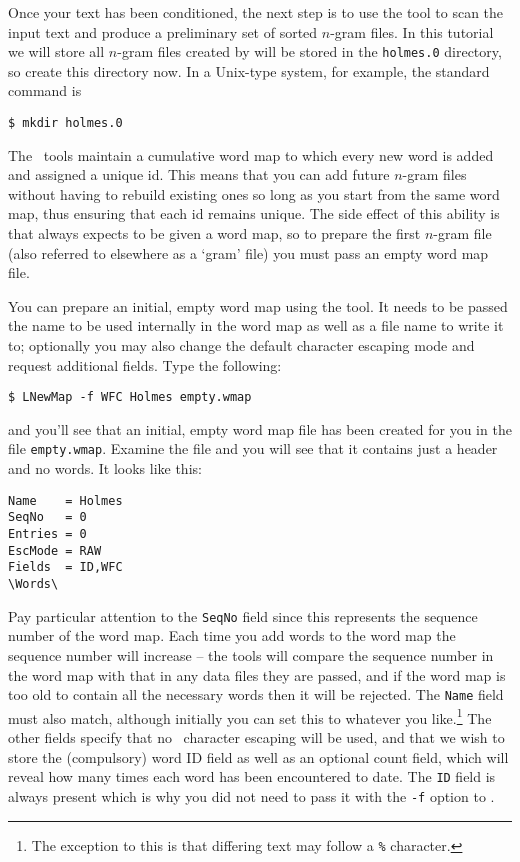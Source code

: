 Once your text has been conditioned, the next step is to use the tool
 to scan the input text and produce a
preliminary set of sorted $n$-gram files.  In this tutorial we will
store all $n$-gram files created by  will be stored in
the \texttt{holmes.0} directory, so create this directory now.  In a
Unix-type system, for example, the standard command is
\begin{verbatim}
$ mkdir holmes.0
\end{verbatim} %

The \HTK\ tools maintain a cumulative word map to which every new
word is added and assigned a unique id.  This means that you can add
future $n$-gram files without having to rebuild existing ones so long
as you start from the same word map, thus ensuring that each id
remains unique.  The side effect of this ability is that
 always expects to be given a word map, so to prepare
the first $n$-gram file (also referred to elsewhere as a `gram' file)
you must pass an empty word map file.

You can prepare an initial, empty word map using the 
tool.  It needs to be passed the name to be used internally in the word
map as well as a file name to write it to;  optionally you may also
change the default character escaping mode and request additional
fields.  Type the following:
\begin{verbatim}
$ LNewMap -f WFC Holmes empty.wmap
\end{verbatim} %
and you'll see that an initial, empty word map file has been created
for you in the file \texttt{empty.wmap}.  Examine the file and you
will see that it contains just a header and no words.  It looks like
this:
\begin{verbatim}
Name    = Holmes
SeqNo   = 0
Entries = 0
EscMode = RAW
Fields  = ID,WFC
\Words\
\end{verbatim}
Pay particular attention to the {\tt SeqNo} field since this
represents the sequence number of the word map.  Each time you add
words to the word map the sequence number will increase -- the tools
will compare the sequence number in the word map with that in any data
files they are passed, and if the word map is too old to contain all
the necessary words then it will be rejected.  The {\tt Name} field
must also match, although initially you can set this to whatever you
like.\footnote{The exception to this is that differing text may follow
a {\tt \%} character.} The other fields specify that no \HTK\
character escaping will be used, and that we wish to store the
(compulsory) word ID field as well as an optional count field, which
will reveal how many times each word has been encountered to date.
The {\tt ID} field is always present which is why you did not need to
pass it with the {\tt -f} option to \htool{LNewMap}.

